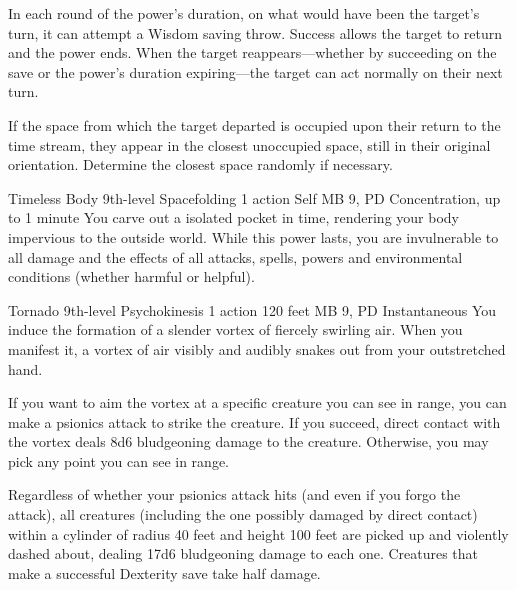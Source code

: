 In each round of the power's duration,
on what would have been the target's turn,
it can attempt a Wisdom saving throw.
Success allows the target to return and the power ends.
When the target reappears---whether by succeeding on the save
or the power's duration expiring---the target
can act normally on their next turn.

If the space from which the target departed is occupied
upon their return to the time stream,
they appear in the closest unoccupied space,
still in their original orientation.
Determine the closest space randomly if necessary.

\DndPowerHeader%
  {Timeless Body}
  {9th-level Spacefolding}
  {1 action}
  {Self}
  {MB 9, PD \lvlnine}
  {Concentration, up to 1 minute}
You carve out a isolated pocket in time,
rendering your body impervious to the outside world.
While this power lasts,
you are invulnerable to all damage and the effects
of all attacks, spells, powers
and environmental conditions
(whether harmful or helpful).

\DndPowerHeader%
  {Tornado}
  {9th-level Psychokinesis}
  {1 action}
  {120 feet}
  {MB 9, PD \lvlnine}
  {Instantaneous}
You induce the formation of a slender vortex
of fiercely swirling air.
When you manifest it,
a vortex of air visibly and audibly snakes out from your
outstretched hand.

If you want to aim the vortex at a specific creature
you can see in range,
you can make a psionics attack to strike the creature.
If you succeed,
direct contact with the vortex deals 8d6 bludgeoning damage
to the creature.
Otherwise,
you may pick any point you can see in range.

Regardless of whether your psionics attack hits
(and even if you forgo the attack),
all creatures
(including the one possibly damaged by direct contact)
within a cylinder of radius 40 feet
and height 100 feet
are picked up and violently dashed about,
dealing 17d6 bludgeoning damage to each one.
Creatures that make a successful Dexterity save
take half damage.

